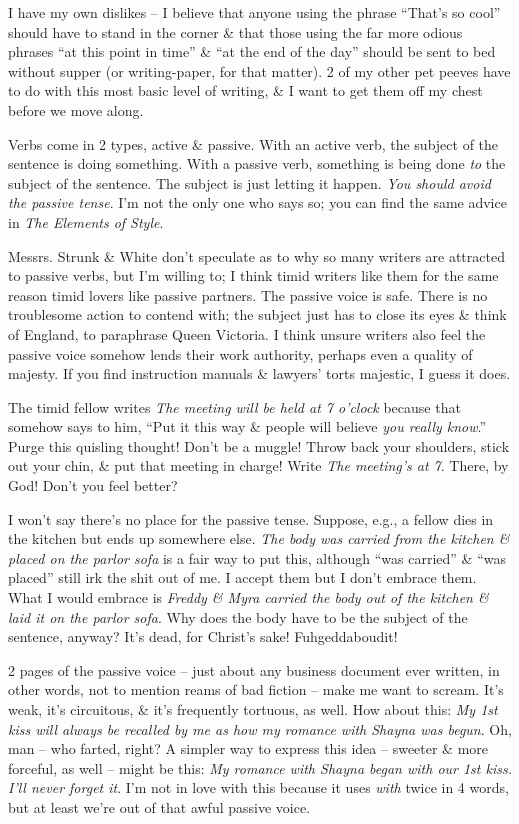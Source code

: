 \documentclass{article}
\numberwithin{equation}{section}
\begin{document}
I have my own dislikes -- I believe that anyone using the phrase ``That's so cool'' should have to stand in the corner \& that those using the far more odious phrases ``at this point in time'' \& ``at the end of the day'' should be sent to bed without supper (or writing-paper, for that matter). 2 of my other pet peeves have to do with this most basic level of writing, \& I want to get them off my chest before we move along.

Verbs come in 2 types, active \& passive. With an active verb, the subject of the sentence is doing something. With a passive verb, something is being done \textit{to} the subject of the sentence. The subject is just letting it happen. \textit{You should avoid the passive tense}. I'm not the only one who says so; you can find the same advice in \textit{The Elements of Style}.

Messrs. Strunk \& White don't speculate as to why so many writers are attracted to passive verbs, but I'm willing to; I think timid writers like them for the same reason timid lovers like passive partners. The passive voice is safe. There is no troublesome action to contend with; the subject just has to close its eyes \& think of England, to paraphrase Queen Victoria. I think unsure writers also feel the passive voice somehow lends their work authority, perhaps even a quality of majesty. If you find instruction manuals \& lawyers' torts majestic, I guess it does.

The timid fellow writes \textit{The meeting will be held at 7 o'clock} because that somehow says to him, ``Put it this way \& people will believe \textit{you really know}.'' Purge this quisling thought! Don't be a muggle! Throw back your shoulders, stick out your chin, \& put that meeting in charge! Write \textit{The meeting's at 7}. There, by God! Don't you feel better?

I won't say there's no place for the passive tense. Suppose, e.g., a fellow dies in the kitchen but ends up somewhere else. \textit{The body was carried from the kitchen \& placed on the parlor sofa} is a fair way to put this, although ``was carried'' \& ``was placed'' still irk the shit out of me. I accept them but I don't embrace them. What I would embrace is \textit{Freddy \& Myra carried the body out of the kitchen \& laid it on the parlor sofa}. Why does the body have to be the subject of the sentence, anyway? It's dead, for Christ's sake! Fuhgeddaboudit!

2 pages of the passive voice -- just about any business document ever written, in other words, not to mention reams of bad fiction -- make me want to scream. It's weak, it's circuitous, \& it's frequently tortuous, as well. How about this: \textit{My 1st kiss will always be recalled by me as how my romance with Shayna was begun}. Oh, man -- who farted, right? A simpler way to express this idea -- sweeter \& more forceful, as well -- might be this: \textit{My romance with Shayna began with our 1st kiss. I'll never forget it}. I'm not in love with this because it uses \textit{with} twice in 4 words, but at least we're out of that awful passive voice.
\end{document}
